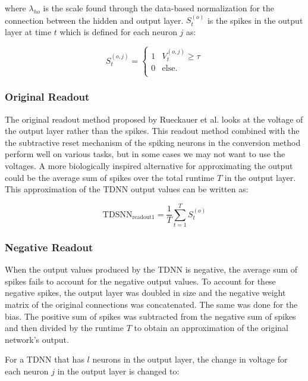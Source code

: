\documentclass{article}
\begin{document}
where $\lambda_{ho}$ is the scale found through the data-based normalization for the connection between the hidden and output layer. $S^{\left(o\right)}_{t}$ is the spikes in the output layer at time $t$ which is defined for each neuron $j$ as:

\begin{equation}
    S^{\left(o,j\right)}_{t} = \begin{cases} 1 & V^{\left(o,j\right)}_{t}\geq \tau \\
      0 & \text{else.} \\ \end{cases}
\end{equation}

\subsubsection*{Original Readout}
The original readout method proposed by Rueckauer et al. looks at the voltage of the output layer rather than the spikes. This readout method combined with the the subtractive reset mechanism of the spiking neurons in the conversion method perform well on various tasks, \cite{rueckauer2017conversion} but in some cases we may not want to use the voltages. A more biologically inspired alternative for approximating the output could be the average sum of spikes over the total runtime $T$ in the output layer. This approximation of the TDNN output values can be written as:

\begin{equation}
    \text{TDSNN}_{\text{readout1}} = \frac{1}{T} \sum_{t=1}^{T}{S_t^{\left(o\right)}}
\end{equation}


\subsubsection*{Negative Readout}
When the output values produced by the TDNN is negative, the average sum of spikes fails to account for the negative output values. To account for these negative spikes, the output layer was doubled in size and the negative weight matrix of the original connections was concatenated. The same was done for the bias. The positive sum of spikes was subtracted from the negative sum of spikes and then divided by the runtime $T$ to obtain an approximation of the original network's output.

For a TDNN that has $l$ neurons in the output layer, the change in voltage for each neuron $j$ in the output layer is changed to:
\end{document}
